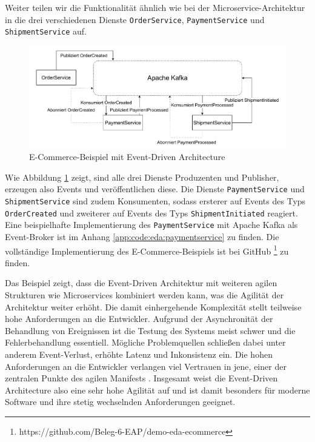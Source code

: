 \documentclass[acmtog]{acmart}
\begin{document}
Weiter teilen wir die Funktionalität ähnlich wie bei der Microservice-Architektur in die drei verschiedenen Dienste \texttt{OrderService}, \texttt{PaymentService} und \texttt{ShipmentService} auf.

\begin{figure}[!h]
  \centering
  \includegraphics[width=\linewidth]{images/eda/eda-ecommerce.drawio}
  \caption{E-Commerce-Beispiel mit Event-Driven Architecture}
  \label{fig:edaecommerce}
\end{figure}
Wie Abbildung \ref{fig:edaecommerce} zeigt, sind alle drei Dienste Produzenten und Publisher, erzeugen also Events und veröffentlichen diese.
Die Dienste \texttt{PaymentService} und \texttt{ShipmentService} sind zudem Konsumenten,
sodass ersterer auf Events des Typs \texttt{OrderCreated} und zweiterer auf Events des Typs \texttt{ShipmentInitiated} reagiert.
Eine beispielhafte Implementierung des \texttt{PaymentService} mit Apache Kafka als Event-Broker ist im Anhang \ref{app:code:eda:paymentservice} zu finden.
Die vollständige Implementierung des E-Commerce-Beispiels ist bei GitHub \footnote{https://github.com/Beleg-6-EAP/demo-eda-ecommerce} zu finden.

Das Beispiel zeigt, dass die Event-Driven Architektur mit weiteren agilen Strukturen wie Microservices kombiniert werden kann, was die Agilität der Architektur weiter erhöht.
Die damit einhergehende Komplexität stellt teilweise hohe Anforderungen an die Entwickler.
Aufgrund der Asynchronität der Behandlung von Ereignissen ist die Testung des Systems meist schwer und die Fehlerbehandlung essentiell.
Mögliche Problemquellen schließen dabei unter anderem Event-Verlust, erhöhte Latenz und Inkonsistenz ein.
Die hohen Anforderungen an die Entwickler verlangen viel Vertrauen in jene, einer der zentralen Punkte des agilen Manifests \cite{agileManifesto}.
Insgesamt weist die Event-Driven Architecture also eine sehr hohe Agilität auf und ist damit besonders für moderne Software und ihre stetig wechselnden Anforderungen geeignet.
\end{document}
